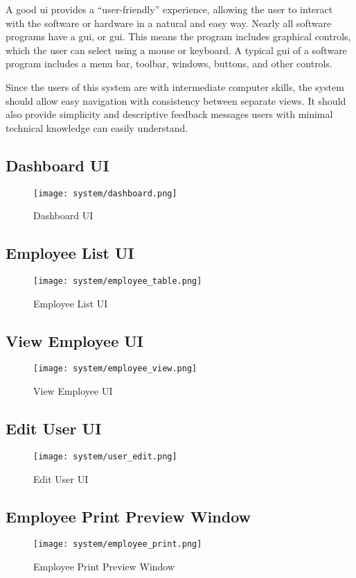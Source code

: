 \documentclass[12pt]{report}
\begin{document}
A good \acrshort{ui} provides a ``user-friendly'' experience, allowing the user to interact with the software or hardware in a natural and easy way. Nearly all software programs have a \acrlong{gui}, or \acrshort{gui}. This means the program includes graphical controls, which the user can select using a mouse or
keyboard. A typical \acrshort{gui} of a software program includes a menu bar, toolbar, windows, buttons, and other controls.

Since the users of this system are with intermediate computer skills, the system should allow easy navigation with consistency between separate views. It should also provide simplicity and descriptive feedback messages users with minimal technical knowledge can easily understand.

\subsection{Dashboard UI}
\begin{figure}[H]
	\centering
	\texttt{[image: system/dashboard.png]}
	\caption{Dashboard UI}
\end{figure}

\subsection{Employee List UI}
\begin{figure}[H]
	\centering
	\texttt{[image: system/employee\_table.png]}
	\caption{Employee List UI}
\end{figure}

\subsection{View Employee UI}
\begin{figure}[H]
	\centering
	\texttt{[image: system/employee\_view.png]}
	\caption{View Employee UI}
\end{figure}

\subsection{Edit User UI}
\begin{figure}[H]
	\centering
	\texttt{[image: system/user\_edit.png]}
	\caption{Edit User UI}
\end{figure}

\subsection{Employee Print Preview Window}
\begin{figure}[H]
	\centering
	\texttt{[image: system/employee\_print.png]}
	\caption{Employee Print Preview Window}
\end{figure}
\end{document}
